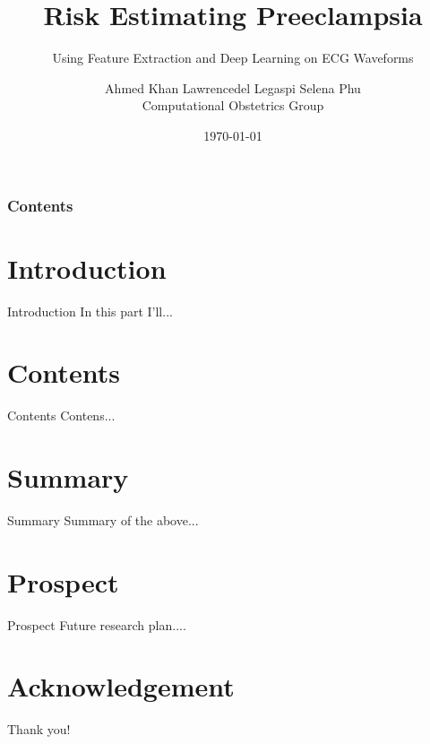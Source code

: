 \documentclass[10pt]{beamer}
\title[Risk Estimating Preeclampsia]{Risk Estimating Preeclampsia}
\subtitle[Using Feature Extraction and Deep Learning on ECG Waveforms]{Using Feature Extraction and Deep Learning on ECG Waveforms}
\author[Computational Obstetrics Group]{Ahmed Khan \hspace{1.2em} Lawrencedel Legaspi \hspace{1.2em} Selena Phu\\[0.5em] \small Computational Obstetrics Group}%
\institute[UC Davis]{UC Davis}
\date[\textcolor{white}{\today} ]
{\today}
\begin{document}
\frame{\titlepage}
\begin{frame}
\frametitle{Contents}
\tableofcontents
\end{frame}
\section{Introduction}
    \begin{frame}{Introduction}
 In this part I'll...
    \end{frame}

\section{Contents}
\begin{frame}{Contents}
	Contens...
\end{frame}



\section{Summary}
    \begin{frame}{Summary}
 Summary of the above...
    \end{frame}


\section{Prospect}
\begin{frame}{Prospect}
	Future research plan....
\end{frame}

\section*{Acknowledgement}
\begin{frame}
\textcolor{myNewColorA}{\Huge{\centerline{Thank you!}}}
\end{frame}
\end{document}
